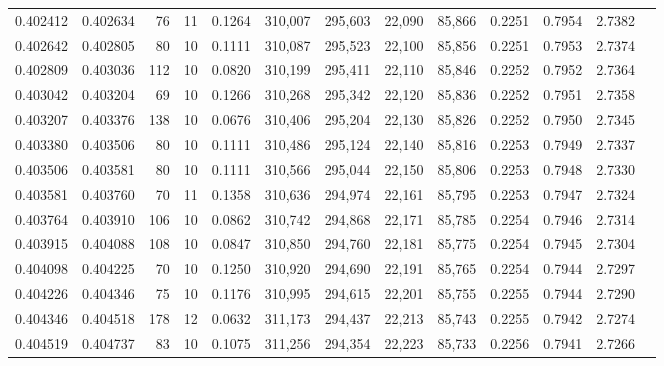 \begin{tabular}{rrrrrrrrrrrrr}
0.402412 & 0.402634 &    76 &  11 &                                     0.1264 & 310,007 & 295,603 &  22,090 &  85,866 & 0.2251 & 0.7954 & 2.7382 \\
0.402642 & 0.402805 &    80 &  10 &                                     0.1111 & 310,087 & 295,523 &  22,100 &  85,856 & 0.2251 & 0.7953 & 2.7374 \\
0.402809 & 0.403036 &   112 &  10 &                                     0.0820 & 310,199 & 295,411 &  22,110 &  85,846 & 0.2252 & 0.7952 & 2.7364 \\
0.403042 & 0.403204 &    69 &  10 &                                     0.1266 & 310,268 & 295,342 &  22,120 &  85,836 & 0.2252 & 0.7951 & 2.7358 \\
0.403207 & 0.403376 &   138 &  10 &                                     0.0676 & 310,406 & 295,204 &  22,130 &  85,826 & 0.2252 & 0.7950 & 2.7345 \\
0.403380 & 0.403506 &    80 &  10 &                                     0.1111 & 310,486 & 295,124 &  22,140 &  85,816 & 0.2253 & 0.7949 & 2.7337 \\
0.403506 & 0.403581 &    80 &  10 &                                     0.1111 & 310,566 & 295,044 &  22,150 &  85,806 & 0.2253 & 0.7948 & 2.7330 \\
0.403581 & 0.403760 &    70 &  11 &                                     0.1358 & 310,636 & 294,974 &  22,161 &  85,795 & 0.2253 & 0.7947 & 2.7324 \\
0.403764 & 0.403910 &   106 &  10 &                                     0.0862 & 310,742 & 294,868 &  22,171 &  85,785 & 0.2254 & 0.7946 & 2.7314 \\
0.403915 & 0.404088 &   108 &  10 &                                     0.0847 & 310,850 & 294,760 &  22,181 &  85,775 & 0.2254 & 0.7945 & 2.7304 \\
0.404098 & 0.404225 &    70 &  10 &                                     0.1250 & 310,920 & 294,690 &  22,191 &  85,765 & 0.2254 & 0.7944 & 2.7297 \\
0.404226 & 0.404346 &    75 &  10 &                                     0.1176 & 310,995 & 294,615 &  22,201 &  85,755 & 0.2255 & 0.7944 & 2.7290 \\
0.404346 & 0.404518 &   178 &  12 &                                     0.0632 & 311,173 & 294,437 &  22,213 &  85,743 & 0.2255 & 0.7942 & 2.7274 \\
0.404519 & 0.404737 &    83 &  10 &                                     0.1075 & 311,256 & 294,354 &  22,223 &  85,733 & 0.2256 & 0.7941 & 2.7266 \\

\end{tabular}
